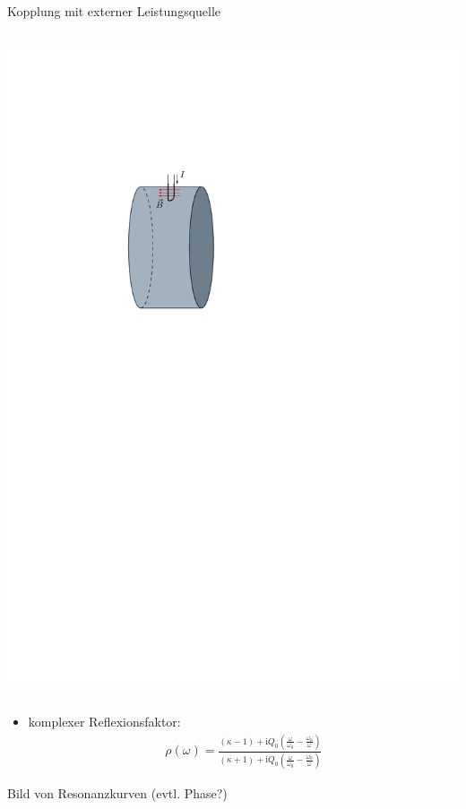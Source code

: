 \documentclass[12pt,xcolor=dvipsnames,professionalfonts]{beamer}
\begin{document}
\begin{frame}{Kopplung mit externer Leistungsquelle}
\begin{columns}[c]
		\centering
		\includegraphics[scale=0.8]{./figures/pillbox_loop.pdf}
	\end{columns}
	
\end{frame}

\begin{frame}
	\begin{itemize}
		\item komplexer Reflexionsfaktor:
		\begin{align*}
			\rho(\omega) = \frac{(\kappa - 1) + \mathrm{i} Q_0 \left(\frac{\omega}{\omega_0} - \frac{\omega_0}{\omega}\right) }{(\kappa + 1) + \mathrm{i} Q_0 \left( \frac{\omega}{\omega_0} - \frac{\omega_0}{\omega} \right)}
		\end{align*}
	\end{itemize}
	
	Bild von Resonanzkurven (evtl. Phase?)
\end{frame}
	
\end{document}
